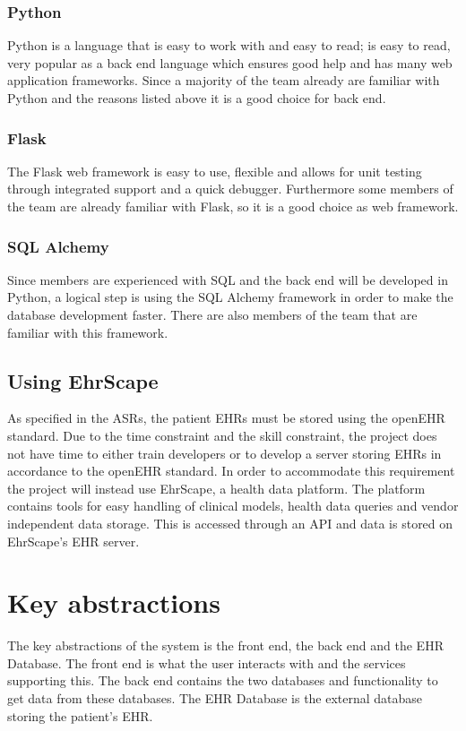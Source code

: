 \documentclass{article}
\begin{document}
\subsubsection{Python}
Python is a language that is easy to work with and easy to read; is easy to read, very popular as a back end language which ensures good help and has many web application frameworks. Since a majority of the team already are familiar with Python and the reasons listed above it is a good choice for back end. 
\subsubsection{Flask}
The Flask web framework is easy to use, flexible and allows for unit testing through integrated support and a quick debugger. Furthermore some members of the team are already familiar with Flask, so it is a good choice as web framework.
\subsubsection{SQL Alchemy}
Since members are experienced with SQL and the back end will be developed in Python, a logical step is using the SQL Alchemy framework in order to make the database development faster. There are also members of the team that are familiar with this framework.

\subsection{Using EhrScape}
As specified in the ASRs, the patient EHRs must be stored using the openEHR standard. Due to the time constraint and the skill constraint, the project does not have time to either train developers or to develop a server storing EHRs in accordance to the openEHR standard. In order to accommodate this requirement the project will instead use EhrScape, a health data platform. The platform contains tools for easy handling of clinical models, health data queries and vendor independent data storage. This is accessed through an API and data is stored on EhrScape's EHR server.



\section{Key abstractions}
The key abstractions of the system is the front end, the back end and the EHR Database. The front end is what the user interacts with and the services supporting this. The back end contains the two databases and functionality to get data from these databases. The EHR Database is the external database storing the patient's EHR.
\end{document}
